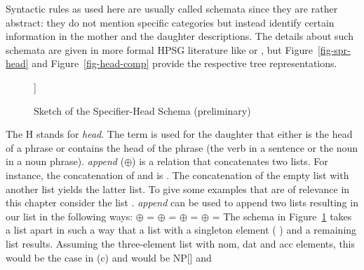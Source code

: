 \noindent
Syntactic rules as used here are usually called schemata since they are rather abstract: they do not
mention specific categories but instead identify certain information in the mother and the daughter descriptions.
The details about such schemata are given in more formal HPSG literature like
 or , 
but Figure~\vref{fig-spr-head} and
Figure~\vref{fig-head-comp} provide the respective tree representations.
\begin{figure}
\begin{forest}
[H\feattab{\spr \ibox{1}}%
  [\ibox{2}]
  [H\feattab{\spr \ibox{1} $\oplus$ \sliste{ \ibox{2} },\\
             \comps \eliste}
  ]]
\end{forest}
\caption{\label{fig-spr-head}Sketch of the Specifier-Head Schema (preliminary)}
\end{figure}
The H stands for \emph{head}. The term  is used for the daughter that either is
the head of a phrase or contains the head of the phrase (\eg the verb in a sentence or the noun in a
noun phrase). \emph{append} ($\oplus$) is a relation that concatenates two 
lists. For instance, the concatenation of  and  is
. The concatenation of the empty list \eliste{} with another list yields
the latter list. To give some examples that are of relevance in this chapter consider the list
. \emph{append} can be used to append two
lists resulting in our list in the following ways:
\eal
\ex \eliste{} $\oplus$  = 
\ex {} $\oplus$  = 
\ex {} $\oplus$  = 
\ex {} $\oplus$ \eliste{} = 
\zl
The schema in Figure~\ref{fig-spr-head} takes a list apart in such a way that a list with a
singleton element (  ) and a remaining list  results. Assuming the
three-element list with nom, dat and acc elements, this would be the case in (c) and  would be NP[] and
